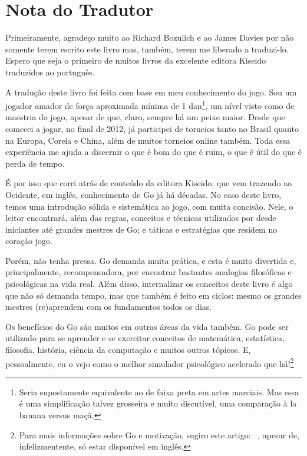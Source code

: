 \chapter{Nota do Tradutor}

Primeiramente, agradeço muito ao Richard Bozulich e ao James Davies por não somente terem escrito este livro mas, também, terem me liberado a traduzi-lo. Espero que seja o primeiro de muitos livros da excelente editora Kiseido~\cite{kiseido} traduzidos ao português.

\bigskip
\bigskip

A tradução deste livro foi feita com base em meu conhecimento do jogo. Sou um jogador amador de força aproximada mínima de 1 dan\footnote{Seria supostamente equivalente ao de faixa preta em artes marciais. Mas essa é uma simplificação talvez grosseira e muito discutível, uma comparação à la banana versus maçã.}, um nível visto como de maestria do jogo, apesar de que, claro, sempre há um peixe maior. Desde que comecei a jogar, no final de 2012, já participei de torneios tanto no Brasil quanto na Europa, Coreia e China, além de muitos torneios online também. Toda essa experiência me ajuda a discernir o que é bom do que é ruim, o que é útil do que é perda de tempo.

É por isso que corri atrás de conteúdo da editora Kiseido, que vem trazendo ao Ocidente, em inglês, conhecimento de Go já há décadas. No caso deste livro, temos uma introdução sólida e sistemática ao jogo, com muita concisão. Nele, o leitor encontrará, além das regras, conceitos e técnicas utilizados por desde iniciantes até grandes mestres de Go; e táticas e estratégias que residem no coração jogo.

Porém, não tenha pressa. Go demanda muita prática, e esta é muito divertida e, principalmente, recompensadora, por encontrar bastantes analogias filosóficas e psicológicas na vida real. Além disso, internalizar os conceitos deste livro é algo que não só demanda tempo, mas que também é feito em ciclos: mesmo os grandes mestres (re)aprendem com os fundamentos todos os dias.

Os benefícios do Go são muitos em outras áreas da vida também. Go pode ser utilizado para se aprender e se exercitar conceitos de matemática, estatística, filosofia, história, ciência da computação e muitos outros tópicos. E, pessoalmente, eu o vejo como o melhor simulador psicológico acelerado que há!\footnote{Para mais informações sobre Go e motivação, sugiro este artigo: \href{https://fanaro.io/articles/why_play_go/why_play_go.html}{}~\cite{why_play_go}, apesar de, infelizmentente, só estar disponível em inglês.}


